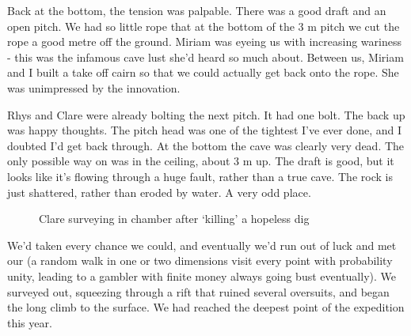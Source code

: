 Back at the bottom, the tension was palpable. There was a good draft and an open pitch. We had so little rope that at the bottom of the 3 m pitch we cut the rope a good metre off the ground. Miriam was eyeing us with increasing wariness - this was the infamous cave lust she'd heard so much about. Between us, Miriam and I built a take off cairn so that we could actually get back onto the rope. She was unimpressed by the innovation.
 
Rhys and Clare were already bolting the next pitch. It had one bolt. The back up was happy thoughts. The pitch head was one of the tightest I've ever done, and I doubted I'd get back through. At the bottom the cave was clearly very dead. The only possible way on was in the ceiling, about 3 m up. The draft is good, but it looks like it's flowing through a huge fault, rather than a true cave. The rock is just shattered, rather than eroded by water. A very odd place.



\begin{figure}[h]
\checkoddpage \ifoddpage \forcerectofloat \else \forceversofloat \fi
\centering
{}
\caption{Clare surveying in \protect{} chamber after `killing' a hopeless dig }
\label{Tight}
\end{figure}
 
We'd taken every chance we could, and eventually we'd run out of luck and met our  (a random walk in one or two dimensions visit every point with probability unity, leading to a gambler with finite money always going bust eventually). We surveyed out, squeezing through a rift that ruined several oversuits, and began the long climb to the surface. We had reached the deepest point of the expedition this year.
 
